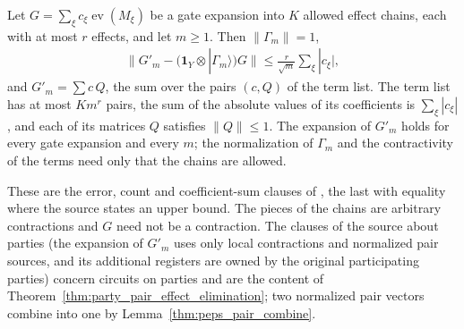 \begin{theorem}
    \label{thm:party_replace_gate}
    \leanok
    Let $G=\sum_\xi c_\xi\operatorname{ev}(M_\xi)$ be a gate expansion into
    $K$ allowed effect chains, each with at most $r$ effects, and let
    $m\ge1$. Then $\lVert\Gamma_m\rVert=1$,
    \begin{align}
        \bigl\lVert G'_m-(\mathbf 1_Y\otimes|\Gamma_m\rangle)G\bigr\rVert
        \le\frac r{\sqrt m}\sum_\xi|c_\xi|,
        \label{eq:party_gate_error}
    \end{align}
    and $G'_m=\sum c\,Q$, the sum over the pairs $(c,Q)$ of the term list.
    The term list has at most $Km^r$ pairs, the sum of the absolute values
    of its coefficients is $\sum_\xi|c_\xi|$, and each of its matrices $Q$
    satisfies $\lVert Q\rVert\le1$. The expansion of $G'_m$ holds for every
    gate expansion and every $m$; the normalization of $\Gamma_m$ and the
    contractivity of the terms need only that the chains are allowed.

    These are the error, count and coefficient-sum clauses of
    \cite[Lemma~5.1]{OpenAI2026PolynomialPEPS}, the last with equality where
    the source states an upper bound. The pieces of the chains are arbitrary
    contractions and $G$ need not be a contraction. The clauses of the
    source about parties (the expansion of $G'_m$ uses only local
    contractions and normalized pair sources, and its additional registers
    are owned by the original participating parties) concern circuits on
    parties and are the content of
    Theorem~\ref{thm:party_pair_effect_elimination}; two normalized pair
    vectors combine into one by Lemma~\ref{thm:peps_pair_combine}.
\end{theorem}

